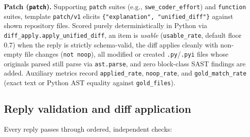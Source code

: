 \documentclass[conference]{IEEEtran}
\begin{document}
\textbf{Patch (\texttt{patch}).} Supporting \texttt{patch} suites (e.g., \texttt{swe\_\allowbreak{}coder\_\allowbreak{}effort}) and \texttt{function} suites, template \texttt{patch/\allowbreak{}v1} elicits \texttt{\{"explanation", "unified\_\allowbreak{}diff"\}} against shown repository files. Scored purely deterministically in Python via \texttt{diff\_\allowbreak{}apply.\allowbreak{}apply\_\allowbreak{}unified\_\allowbreak{}diff}, an item is \emph{usable} (\texttt{usable\_\allowbreak{}rate}, default floor 0.7) when the reply is strictly schema-valid, the diff applies cleanly with non-empty file changes (\texttt{not noop}), all modified or created \texttt{.py}/\texttt{.pyi} files whose originals parsed still parse via \texttt{ast.\allowbreak{}parse}, and zero block-class SAST findings are added. Auxiliary metrics record \texttt{applied\_\allowbreak{}rate}, \texttt{noop\_\allowbreak{}rate}, and \texttt{gold\_\allowbreak{}match\_\allowbreak{}rate} (exact text or Python AST equality against \texttt{gold\_\allowbreak{}files}).

\subsection{Reply validation and diff application}
\label{sec:design-scoring}

Every reply passes through ordered, independent checks:
\end{document}
